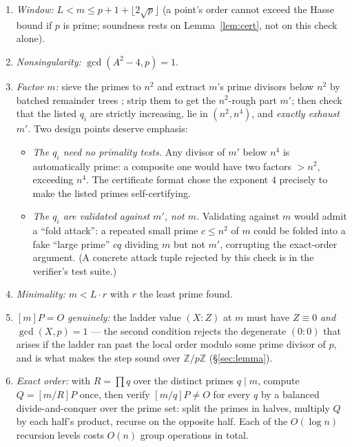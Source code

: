 \documentclass[11pt]{amsart}
\newcommand{\Z}{\mathbb{Z}}
\theoremstyle{plain}
\theoremstyle{definition}
\theoremstyle{remark}
\begin{document}
\begin{enumerate}
\item \emph{Window:} $L < m \le p+1+\lfloor 2\sqrt p\rfloor$ (a point's order cannot exceed the Hasse
bound if $p$ is prime; soundness rests on Lemma~\ref{lem:cert}, not on this check alone).
\item \emph{Nonsingularity:} $\gcd(A^2-4, p) = 1$.
\item \emph{Factor $m$:} sieve the primes to $n^2$ and extract $m$'s prime divisors below $n^2$ by
batched remainder trees \cite{Bern04}; strip them to get the $n^2$-rough part $m'$; then check that the
listed $q_i$ are strictly increasing, lie in $(n^2, n^4)$, and \emph{exactly exhaust $m'$}.  Two design
points deserve emphasis:
\begin{itemize}
\item \emph{The $q_i$ need no primality tests.}  Any divisor of $m'$ below $n^4$ is automatically prime:
a composite one would have two factors ${}> n^2$, exceeding $n^4$.  The certificate format chose the
exponent $4$ precisely to make the listed primes self-certifying.
\item \emph{The $q_i$ are validated against $m'$, not $m$.}  Validating against $m$ would admit a
``fold attack'': a repeated small prime $c \le n^2$ of $m$ could be folded into a fake ``large prime''
$cq$ dividing $m$ but not $m'$, corrupting the exact-order argument.  (A concrete attack tuple rejected
by this check is in the verifier's test suite.)
\end{itemize}
\item \emph{Minimality:} $m < L\cdot r$ with $r$ the least prime found.
\item \emph{$[m]P = O$ genuinely:} the ladder value $(X : Z)$ at $m$ must have $Z \equiv 0$ \emph{and}
$\gcd(X, p) = 1$ --- the second condition rejects the degenerate $(0 : 0)$ that arises if the ladder ran
past the local order modulo some prime divisor of $p$, and is what makes the step sound over $\Z/p\Z$
(\S\ref{sec:lemma}).
\item \emph{Exact order:} with $R = \prod q$ over the distinct primes $q \mid m$, compute
$Q = [m/R]P$ once, then verify $[m/q]P \ne O$ for every $q$ by a balanced divide-and-conquer over the
prime set: split the primes in halves, multiply $Q$ by each half's product, recurse on the opposite
half.  Each of the $O(\log n)$ recursion levels costs $O(n)$ group operations in total.
\end{enumerate}
\end{document}
